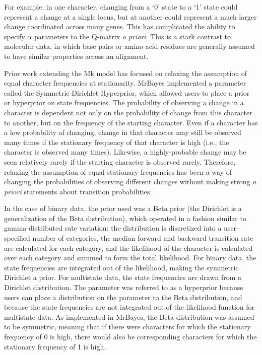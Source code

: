 \documentclass[]{article}
\begin{document}
	For example, in one character, changing from a `0' state to a `1' state could represent a change at a single locus, but at another could represent a much larger change coordinated across many genes.
	This has complicated the ability to specify $\alpha$ parameters to the Q-matrix \textit{a priori}.
	This is a stark contrast to molecular data, in which base pairs or amino acid residues are generally assumed to have similar properties across an alignment. \par
Prior work extending the Mk model has focused on relaxing the assumption of equal character frequencies at stationarity.
MrBayes implemented a parameter called the Symmetric Dirichlet Hyperprior, which allowed users to place a prior or hyperprior on state frequencies. 
The probability of observing a change in a character is dependent not only on the probability of change from this character to another, but on the frequency of the starting character.
Even if a character has a low probability of changing, change in that character may still be observed many times if the stationary frequency of that character is high (i.e., the character is observed many times). 
Likewise, a highly-probable change may be seen relatively rarely if the starting character is observed rarely. 
Therefore, relaxing the assumption of equal stationary frequencies has been a way of changing the probabilities of observing different changes without making strong \textit{a priori} statements about transition probabilities. \par
In the case of binary data, the prior used was a Beta prior (the Dirichlet is a generalization of the Beta distribution), which operated in a fashion similar to gamma-distributed rate variation: the distribution is discretized into a user-specified number of categories, the median forward and backward transition rate are calculated for each category, and the likelihood of the character is calculated over each category and summed to form the total likelihood. 
For binary data, the state frequencies are integrated out of the likelihood, making the symmetric Dirichlet a prior.
For multistate data, the state frequencies are drawn from a Dirichlet distribution.
The parameter was referred to as a hyperprior because users can place a distribution on the parameter to the Beta distribution, and because the state frequencies are not integrated out of the likelihood function for multistate data. 
As implemented in MrBayes, the Beta distribution was assumed to be symmetric, meaning that if there were characters for which the stationary frequency of 0 is high, there would also be corresponding characters for which the stationary frequency of 1 is high.\par
\end{document}
